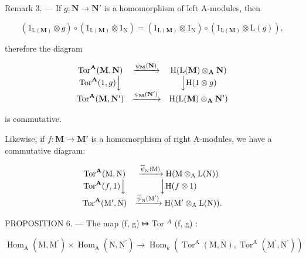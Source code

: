 Remark 3. --- If \(g: \mathbf{N} \to \mathbf{N}'\) is a homomorphism of left A-modules, then

\[
\left(1 _ {\mathrm{L} (\mathbf {M})} \otimes g\right) \circ \left(1 _ {\mathrm{L} (\mathbf {M})} \otimes 1 _ {\mathrm{N}}\right) = \left(1 _ {\mathrm{L} (\mathbf {M})} \otimes 1 _ {\mathrm{N}}\right) \circ \left(1 _ {\mathrm{L} (\mathbf {M})} \otimes \mathrm{L} (g)\right),
\]

therefore the diagram

\[
\begin{array}{c c c} \operatorname{Tor} ^ {\mathbf {A}} (\mathbf {M}, \mathbf {N}) & \xrightarrow {\psi_ {\mathbf {M}} (\mathbf {N})} & \mathrm{H} (\mathrm{L} (\mathbf {M}) \otimes_ {\mathbf {A}} \mathbf {N}) \\ \operatorname{Tor} ^ {\mathbf {A}} (1, g) \Big \downarrow & & \Big \downarrow \mathrm{H} (1 \otimes g) \\ \operatorname{Tor} ^ {\mathbf {A}} (\mathbf {M}, \mathbf {N} ^ {\prime}) & \xrightarrow {\psi_ {\mathbf {M}} (\mathbf {N} ^ {\prime})} & \mathrm{H} (\mathrm{L} (\mathbf {M}) \otimes_ {\mathbf {A}} \mathbf {N} ^ {\prime}) \end{array}
\]

is commutative.

Likewise, if \(f: \mathbf{M} \to \mathbf{M}'\) is a homomorphism of right A-modules, we have a commutative diagram:

\[
\begin{array}{c c} \operatorname{Tor} ^ {\mathbf {A}} (\mathrm{M}, \mathrm{N}) & \xrightarrow {\overline {{\psi}} _ {\mathrm{N}} (\mathrm{M})} \mathrm{H} (\mathrm{M} \otimes_ {\mathrm{A}} \mathrm{L} (\mathrm{N})) \\ \operatorname{Tor} ^ {\mathbf {A}} (f, 1) \Big \downarrow & \Big \downarrow \mathrm{H} (f \otimes 1) \\ \operatorname{Tor} ^ {\mathbf {A}} (\mathrm{M} ^ {\prime}, \mathrm{N}) & \xrightarrow {\overline {{\psi}} _ {\mathrm{N}} (\mathrm{M} ^ {\prime})} \mathrm{H} (\mathrm{M} ^ {\prime} \otimes_ {\mathrm{A}} \mathrm{L} (\mathrm{N})). \end{array}
\]

PROPOSITION 6. --- The map (f, g) ↦ Tor \(^{A}\) (f, g) :

\[
\operatorname{Hom} _ {\mathrm{A}} \left(\mathrm{M}, \mathrm{M} ^ {\prime}\right) \times \operatorname{Hom} _ {\mathrm{A}} \left(\mathrm{N}, \mathrm{N} ^ {\prime}\right)\rightarrow \operatorname{Hom} _ {k} \left(\operatorname{Tor} ^ {\mathrm{A}} (\mathrm{M}, \mathrm{N}), \operatorname{Tor} ^ {\mathrm{A}} \left(\mathrm{M} ^ {\prime}, \mathrm{N} ^ {\prime}\right)\right)
\]

